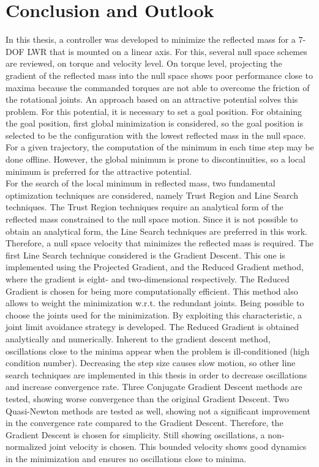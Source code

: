 \chapter{Conclusion and Outlook}
\label{ch:conclusion}


In this thesis, a controller was developed to minimize the reflected mass for a 7-DOF LWR that is mounted on a linear axis. For this, several null space schemes are reviewed, on torque and velocity level. On torque level, projecting the gradient of the reflected mass into the null space shows poor performance close to maxima because the commanded torques are not able to overcome the friction of the rotational joints. An approach based on an attractive potential  solves this problem. For this potential, it is necessary to set a goal position. For obtaining the goal position, first global minimization is considered, so the goal position is selected to be the configuration with the lowest reflected mass in the null space.  For a given trajectory, the computation of the minimum in each time step may be done offline. However, the global minimum is prone to discontinuities, so a local minimum is preferred for the attractive potential. \\
For the search of the local minimum in reflected mass, two fundamental optimization techniques are considered, namely Trust Region and Line Search techniques. The Trust Region techniques require an analytical form of the reflected mass constrained to the null space motion. Since it is not possible to obtain an analytical form, the Line Search techniques are preferred in this work. Therefore, a null space velocity that minimizes the reflected mass is required. The first Line Search technique considered is the Gradient Descent. This one is implemented using the Projected Gradient, and the Reduced Gradient method, where the gradient is eight- and two-dimensional respectively. The Reduced Gradient is  chosen for being more computationally efficient. This method also allows to weight the minimization w.r.t. the redundant joints. Being possible to choose the joints used for the minimization. By exploiting this characteristic, a joint limit avoidance strategy is developed.  The Reduced Gradient is obtained analytically and numerically. Inherent to the gradient descent method, oscillations close to the minima appear when the problem is ill-conditioned (high condition number). Decreasing the step size causes slow motion, so other line search techniques are implemented in this thesis in order to decrease oscillations and increase convergence rate. Three Conjugate Gradient Descent methods are tested, showing worse convergence than the original Gradient Descent. Two Quasi-Newton methods are tested as well, showing not a significant improvement in the convergence rate compared to the Gradient Descent. Therefore, the Gradient Descent is chosen for simplicity. %
Still showing oscillations, a  non-normalized joint velocity is chosen. This bounded velocity   shows good dynamics in the minimization and ensures no oscillations close to minima.

